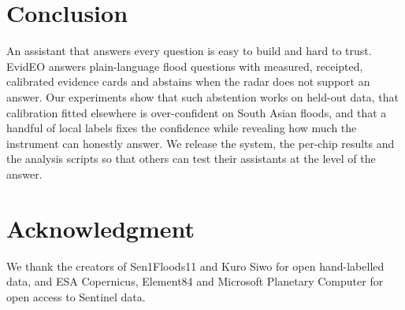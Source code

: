 \documentclass[conference]{IEEEtran}
\begin{document}
\section{Conclusion}

An assistant that answers every question is easy to build and hard to trust. EvidEO answers plain-language flood questions with measured, receipted, calibrated evidence cards and abstains when the radar does not support an answer. Our experiments show that such abstention works on held-out data, that calibration fitted elsewhere is over-confident on South Asian floods, and that a handful of local labels fixes the confidence while revealing how much the instrument can honestly answer. We release the system, the per-chip results and the analysis scripts so that others can test their assistants at the level of the answer.

\section*{Acknowledgment}
We thank the creators of Sen1Floods11 and Kuro Siwo for open hand-labelled data, and ESA Copernicus, Element84 and Microsoft Planetary Computer for open access to Sentinel data.



\end{document}
